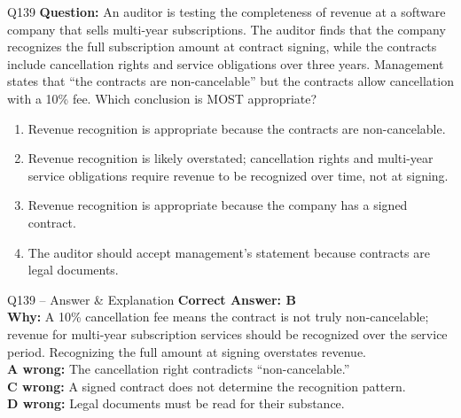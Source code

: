 \documentclass[aspectratio=169,10pt]{beamer}
\begin{document}
	\begin{frame}[t]{Q139}
		\small
		\textbf{Question:} An auditor is testing the completeness of revenue at a software company that sells multi-year subscriptions. The auditor finds that the company recognizes the full subscription amount at contract signing, while the contracts include cancellation rights and service obligations over three years. Management states that ``the contracts are non-cancelable'' but the contracts allow cancellation with a 10\% fee. Which conclusion is MOST appropriate?
		\begin{enumerate}[label=\Alph*.,itemsep=1pt,topsep=2pt]
			\item Revenue recognition is appropriate because the contracts are non-cancelable.
			\item Revenue recognition is likely overstated; cancellation rights and multi-year service obligations require revenue to be recognized over time, not at signing.
			\item Revenue recognition is appropriate because the company has a signed contract.
			\item The auditor should accept management's statement because contracts are legal documents.
		\end{enumerate}
	\end{frame}
	
	\begin{frame}[t]{Q139 -- Answer \& Explanation}
		\small
		\textbf{Correct Answer: B} \\[4pt]
		\textbf{Why:} A 10\% cancellation fee means the contract is not truly non-cancelable; revenue for multi-year subscription services should be recognized over the service period. Recognizing the full amount at signing overstates revenue. \\[4pt]
		\textbf{A wrong:} The cancellation right contradicts ``non-cancelable.'' \\[2pt]
		\textbf{C wrong:} A signed contract does not determine the recognition pattern. \\[2pt]
		\textbf{D wrong:} Legal documents must be read for their substance.
	\end{frame}
	
\end{document}
